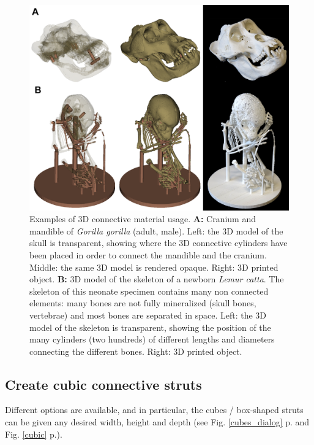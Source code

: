 \begin{figure}
  \centering
  \includegraphics[scale=1.40]{images/09/create_3D_printing_support_surfaces/support_example.png} 
	\caption{Examples of 3D connective material usage. \textbf{A:} Cranium and mandible of \textit{Gorilla gorilla} (adult, male). Left: the 3D model of the skull is transparent, showing where the 3D connective cylinders have been placed in order to connect the mandible and the cranium. Middle: the same 3D model is rendered opaque. Right: 3D printed object. \textbf{B:} 3D model of the skeleton of a newborn \textit{Lemur catta}. The skeleton of this neonate specimen contains many non connected elements: many bones are not fully mineralized (skull bones, vertebrae) and most bones are separated in space. Left: the 3D model of the skeleton is transparent, showing the position of the many cylinders (two hundreds) of different lengths and diameters connecting the different bones. Right: 3D printed object. }
 \label{support_example}
\end{figure}

\subsection{Create cubic connective struts}
Different options are available, and in particular, the cubes / box-shaped struts can be given any desired width, height and depth (see Fig.  \ref{cubes_dialog} p.\pageref{cubes_dialog} and Fig. \ref{cubic} p.\pageref{cubic}). 

